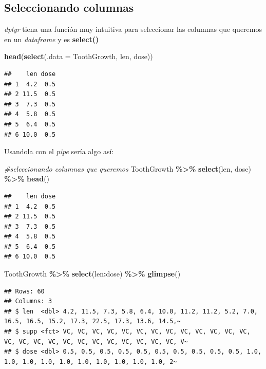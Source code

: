 \documentclass[
]{book}
\newenvironment{Shaded}{\begin{snugshade}}{\end{snugshade}}
\newcommand{\AttributeTok}[1]{\textcolor[rgb]{0.13,0.29,0.53}{#1}}
\newcommand{\CommentTok}[1]{\textcolor[rgb]{0.56,0.35,0.01}{\textit{#1}}}
\newcommand{\FunctionTok}[1]{\textcolor[rgb]{0.13,0.29,0.53}{\textbf{#1}}}
\newcommand{\NormalTok}[1]{#1}
\newcommand{\SpecialCharTok}[1]{\textcolor[rgb]{0.81,0.36,0.00}{\textbf{#1}}}
\begin{document}
\subsection{Seleccionando columnas}\label{seleccionando-columnas-1}

\emph{dplyr} tiena una función muy intuitiva para seleccionar las columnas que queremos en un \emph{dataframe} y es \textbf{select()}

\begin{Shaded}
\begin{Highlighting}[]
\FunctionTok{head}\NormalTok{(}\FunctionTok{select}\NormalTok{(}\AttributeTok{.data =}\NormalTok{ ToothGrowth, len, dose))}
\end{Highlighting}
\end{Shaded}

\begin{verbatim}
##    len dose
## 1  4.2  0.5
## 2 11.5  0.5
## 3  7.3  0.5
## 4  5.8  0.5
## 5  6.4  0.5
## 6 10.0  0.5
\end{verbatim}

Usandola con el \emph{pipe} sería algo así:\\

\begin{Shaded}
\begin{Highlighting}[]
\CommentTok{\#seleccionando columnas que queremos}
\NormalTok{ToothGrowth }\SpecialCharTok{\%\textgreater{}\%} \FunctionTok{select}\NormalTok{(len, dose) }\SpecialCharTok{\%\textgreater{}\%} \FunctionTok{head}\NormalTok{()}
\end{Highlighting}
\end{Shaded}

\begin{verbatim}
##    len dose
## 1  4.2  0.5
## 2 11.5  0.5
## 3  7.3  0.5
## 4  5.8  0.5
## 5  6.4  0.5
## 6 10.0  0.5
\end{verbatim}

\begin{Shaded}
\begin{Highlighting}[]
\NormalTok{ToothGrowth }\SpecialCharTok{\%\textgreater{}\%} \FunctionTok{select}\NormalTok{(len}\SpecialCharTok{:}\NormalTok{dose) }\SpecialCharTok{\%\textgreater{}\%} \FunctionTok{glimpse}\NormalTok{()}
\end{Highlighting}
\end{Shaded}

\begin{verbatim}
## Rows: 60
## Columns: 3
## $ len  <dbl> 4.2, 11.5, 7.3, 5.8, 6.4, 10.0, 11.2, 11.2, 5.2, 7.0, 16.5, 16.5, 15.2, 17.3, 22.5, 17.3, 13.6, 14.5,~
## $ supp <fct> VC, VC, VC, VC, VC, VC, VC, VC, VC, VC, VC, VC, VC, VC, VC, VC, VC, VC, VC, VC, VC, VC, VC, VC, VC, V~
## $ dose <dbl> 0.5, 0.5, 0.5, 0.5, 0.5, 0.5, 0.5, 0.5, 0.5, 0.5, 1.0, 1.0, 1.0, 1.0, 1.0, 1.0, 1.0, 1.0, 1.0, 1.0, 2~
\end{verbatim}
\end{document}
